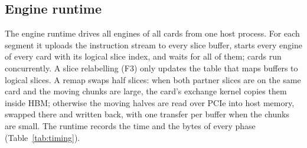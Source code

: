 \subsection{Engine runtime}\label{subsec:runtime}

The engine runtime drives all engines of all cards from one host process. For each segment it uploads the
instruction stream to every slice buffer, starts every engine of every card with its logical slice index, and waits
for all of them; cards run concurrently. A slice relabelling (F3) only updates the table that maps buffers to logical
slices. A remap swaps half slices: when both partner slices are on the same card and the moving chunks are large, the
card's exchange kernel copies them inside HBM; otherwise the moving halves are read over PCIe into host memory, swapped
there and written back, with one transfer per buffer when the chunks are small. The runtime records the time and the
bytes of every phase (Table~\ref{tab:timing}).


